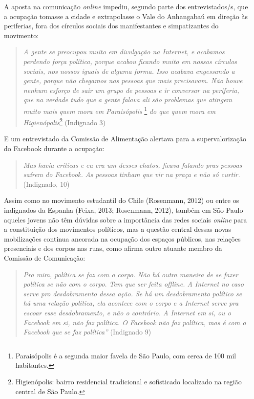 A aposta na comunicação \emph{\emph{\emph{online}}} impediu, segundo parte dos
entrevistados/s, que a ocupação tomasse a cidade e extrapolasse o Vale
do Anhangabaú em direção às periferias, fora dos círculos sociais dos
manifestantes e simpatizantes do movimento:

\begin{quote}
\emph{A gente se preocupou muito em divulgação na Internet, e acabamos
perdendo força política, porque acabou ficando muito em nossos círculos
sociais, nos nossos iguais de alguma forma. Isso acabava engessando a
gente, porque não chegamos nas pessoas que mais precisavam. Não houve
nenhum esforço de sair um grupo de pessoas e ir conversar na periferia,
que na verdade tudo que a gente falava ali são problemas que atingem
muito mais quem mora em Paraisópolis} \footnote{Paraisópolis é a segunda
  maior favela de São Paulo, com cerca de 100 mil habitantes.} \emph{do
que quem mora em Higienópolis}\footnote{Higienópolis: bairro residencial
  tradicional e sofisticado localizado na região central de São Paulo.}
(Indignado 3)
\end{quote}

E um entrevistado da Comissão de Alimentação alertava para a
supervalorização do Facebook durante a ocupação:

\begin{quote}
\emph{Mas havia críticas e eu era um desses chatos, ficava falando pras
pessoas saírem do Facebook. As pessoas tinham que vir na praça e não só
curtir.} (Indignado, 10)
\end{quote}

Assim como no movimento estudantil do Chile (Rosenmann, 2012) ou entre
os indignados da Espanha (Feixa, 2013; Rosenmann, 2012), também em São
Paulo aqueles jovens não têm dúvidas sobre a importância das redes
sociais \emph{\emph{\emph{online}}} para a constituição dos movimentos políticos, mas
a questão central dessas novas mobilizações continua ancorada na
ocupação dos espaços públicos, nas relações presenciais e dos corpos nas
ruas, como afirma outro atuante membro da Comissão de Comunicação:

\begin{quote}
\emph{Pra mim, política se faz com o corpo. Não há outra maneira de se
fazer política se não com o corpo. Tem que ser feita \emph{offline}. A
Internet no caso serve pro desdobramento dessa ação. Se há um
desdobramento político se há uma relação política, ela acontece com o
corpo e a Internet serve pra escoar esse desdobramento, e não o
contrário. A Internet em si, ou o Facebook em si, não faz política. O
Facebook não faz política, mas é com o Facebook que se faz política''}
(Indignado 9)
\end{quote}

